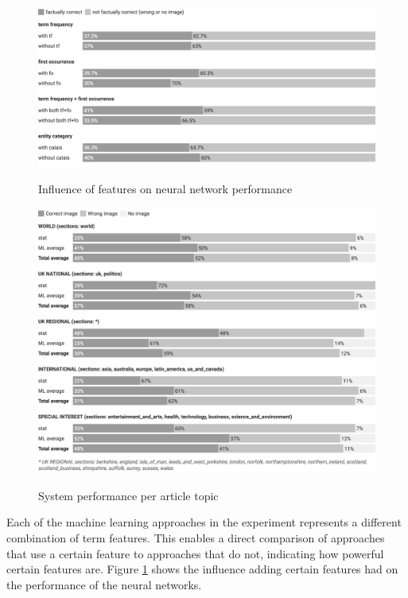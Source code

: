 \documentclass[11pt,a4paper,twoside]{article}
\begin{document}
\begin{figure}[h]
    \caption{Influence of features on neural network performance}
    \centering
    \includegraphics[width=\columnwidth]{fig-feature-influence.png}
    \label{fig:feature-influence}
\end{figure}

\begin{figure}[h]
    \caption{System performance per article topic}
    \centering
    \includegraphics[width=\columnwidth]{fig-perf-per-topic.png}
    \label{fig:perf-per-topic}
\end{figure}

\clearpage

Each of the machine learning approaches in the experiment represents a different combination of term features. This enables a direct comparison of approaches that use a certain feature to approaches that do not, indicating how powerful certain features are. Figure \ref{fig:feature-influence} shows the influence adding certain features had on the performance of the neural networks. 
\end{document}
